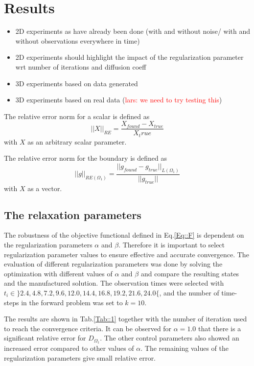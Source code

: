 \documentclass[11pt,a4paper]{article}
\renewcommand{\comment}[1]{\textcolor{red}{#1}}
\begin{document}
\section{Results}
\begin{itemize}
\item 2D experiments as have already been done (with and without noise/ with and without observations everywhere in time) 
\item 2D experiments should highlight the impact of the regularization parameter wrt number of iterations and diffusion 
coeff 
\item 3D experiments based on data generated  
\item 3D experiments based on real data (\comment{lars: we need to try testing this}) 
\end{itemize}



The relative error norm for a scalar is defined as 
\begin{equation}
|| X ||_{RE} = \frac{X_{found} -X_{true} }{ X_true }
\end{equation}
with $X$ as an arbitrary scalar parameter.

The relative error norm for the boundary is defined as 
\begin{equation}
|| g ||_{RE(\Omega_1)} = \frac{||g_{found} -g_{true}||_{L(\Omega_1)} }{ ||g_{true}|| }
\end{equation}
with $X$ as a vector.
\subsection{The relaxation parameters}

The robustness of the objective functional defined in Eq.\ref{Eq::F} is dependent on the regularization parameters $\alpha$ and $\beta$. Therefore it is important to select regularization parameter values to ensure effective and accurate convergence. The evaluation of different regularization parameters was done by solving the optimization  with  different values of $\alpha$ and $\beta$ and compare the resulting states and the manufactured solution. The observation times were selected with $t_i \in  \rbrace 2.4, 4.8, 7.2, 9.6, 12.0, 14.4, 16.8, 19.2, 21.6, 24.0 \lbrace$, and the number of time-steps in the forward problem was set to $k= 10$. 

The results are shown in Tab.\ref{Tab::1} together with the number of iteration used to reach the convergence criteria. It can be observed for $\alpha= 1.0$ that there is a significant relative error for $D_{\Omega_1}$.  The other control parameters also showed an increased error compared to other values of $\alpha$. The remaining values of the regularization parameters give small relative error. 
\end{document}

